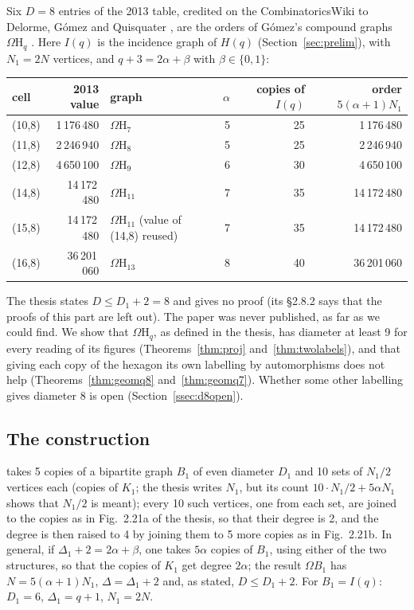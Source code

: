 \documentclass[11pt]{amsart}
\theoremstyle{definition}
\theoremstyle{remark}
\numberwithin{equation}{section}
\newcommand{\Om}{\Omega\mathrm H}
\begin{document}
Six $D=8$ entries of the 2013 table, credited on the CombinatoricsWiki to Delorme, G\'omez and Quisquater \cite{DGQ},
are the orders of G\'omez's compound graphs $\Om_q$ \cite[\S2.9.3, values on p.~46]{Go86}. Here $I(q)$ is the incidence graph
of $H(q)$ (Section~\ref{sec:prelim}), with $N_1=2N$ vertices, and $q+3=2\alpha+\beta$ with $\beta\in\{0,1\}$:
\begin{center}
\begin{tabular}{@{}l r l r r r@{}}
\toprule cell & 2013 value & graph & $\alpha$ & copies of $I(q)$ & order $5(\alpha+1)N_1$\\ \midrule
(10,8) & 1\,176\,480 & $\Om_7$ & 5 & 25 & 1\,176\,480\\
(11,8) & 2\,246\,940 & $\Om_8$ & 5 & 25 & 2\,246\,940\\
(12,8) & 4\,650\,100 & $\Om_9$ & 6 & 30 & 4\,650\,100\\
(14,8) & 14\,172\,480 & $\Om_{11}$ & 7 & 35 & 14\,172\,480\\
(15,8) & 14\,172\,480 & $\Om_{11}$ (value of (14,8) reused) & 7 & 35 & 14\,172\,480\\
(16,8) & 36\,201\,060 & $\Om_{13}$ & 8 & 40 & 36\,201\,060\\ \bottomrule
\end{tabular}
\end{center}
The thesis states $D\le D_1+2=8$ and gives no proof (its \S2.8.2 says that the proofs of this part are left out). The paper
\cite{DGQ} was never published, as far as we could find. We show that $\Om_q$, as defined in the thesis, has diameter at
least 9 for every reading of its figures (Theorems~\ref{thm:proj} and~\ref{thm:twolabels}), and that giving each copy of
the hexagon its own labelling by automorphisms does not help (Theorems~\ref{thm:geomq8} and~\ref{thm:geomq7}). Whether some
other labelling gives diameter 8 is open (Section~\ref{ssec:d8open}).

\subsection{The construction}
\cite[\S2.9.3, pp.~43--45]{Go86} takes 5 copies of a bipartite graph $B_1$ of even diameter $D_1$ and 10 sets of $N_1/2$
vertices each (copies of $K_1$; the thesis writes $N_1$, but its count $10\cdot N_1/2+5\alpha N_1$ shows that $N_1/2$ is meant); every 10 such vertices, one from each set, are joined to the copies as in Fig.~2.21a of the
thesis, so that their degree is 2, and the degree is then raised to 4 by joining them to 5 more copies as in Fig.~2.21b. In
general, if $\Delta_1+2=2\alpha+\beta$, one takes $5\alpha$ copies of $B_1$, using either of the two structures, so that the
copies of $K_1$ get degree $2\alpha$; the result $\Omega B_1$ has $N=5(\alpha+1)N_1$, $\Delta=\Delta_1+2$ and, as stated,
$D\le D_1+2$. For $B_1=I(q)$: $D_1=6$, $\Delta_1=q+1$, $N_1=2N$.
\end{document}
